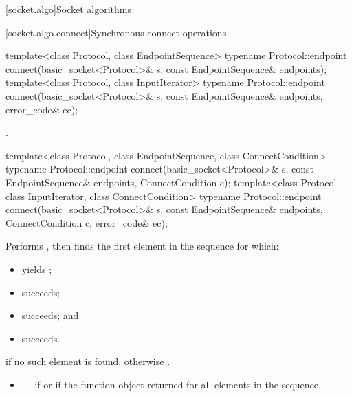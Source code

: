 
[socket.algo]{Socket algorithms}


[socket.algo.connect]{Synchronous connect operations}

\begin{itemdecl}
template<class Protocol, class EndpointSequence>
  typename Protocol::endpoint connect(basic_socket<Protocol>& s,
                                      const EndpointSequence& endpoints);
template<class Protocol, class InputIterator>
  typename Protocol::endpoint connect(basic_socket<Protocol>& s,
                                      const EndpointSequence& endpoints,
                                      error_code& ec);
\end{itemdecl}

\begin{itemdescr}
\pnum
\returns {}.
\end{itemdescr}

\begin{itemdecl}
template<class Protocol, class EndpointSequence, class ConnectCondition>
  typename Protocol::endpoint connect(basic_socket<Protocol>& s,
                                      const EndpointSequence& endpoints,
                                      ConnectCondition c);
template<class Protocol, class InputIterator, class ConnectCondition>
  typename Protocol::endpoint connect(basic_socket<Protocol>& s,
                                      const EndpointSequence& endpoints,
                                      ConnectCondition c, error_code& ec);
\end{itemdecl}

\begin{itemdescr}
\pnum
\effects Performs , then finds the first element  in the sequence  for which:
\begin{itemize}
\item
{} yields ;
\item
{} succeeds;
\item
{} succeeds; and
\item
{} succeeds.
\end{itemize}

\pnum
\returns {} if no such element is found, otherwise .

\pnum
\errors
\begin{itemize}
\item
{} --- if  or if the function object  returned  for all elements in the sequence.
\end{itemize}
\end{itemdescr}

